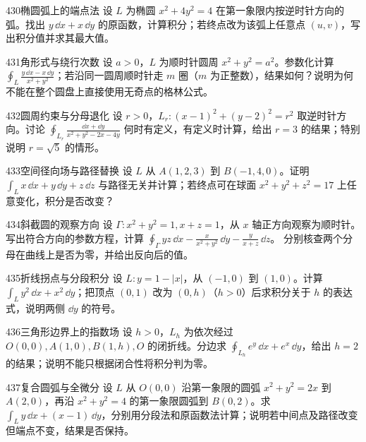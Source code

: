 \begin{exercise}{430}{椭圆弧上的端点法}
设 $L$ 为椭圆 $x^2+4y^2=4$ 在第一象限内按逆时针方向的弧。找出 $y\,\dd x+x\,\dd y$ 的原函数，计算积分；若终点改为该弧上任意点 $(u,v)$，写出积分值并求其最大值。
\end{exercise}

\begin{exercise}{431}{角形式与绕行次数}
设 $a>0$，$L$ 为顺时针圆周 $x^2+y^2=a^2$。参数化计算 $\oint_L\frac{y\,\dd x-x\,\dd y}{x^2+y^2}$；若沿同一圆周顺时针走 $m$ 圈（$m$ 为正整数），结果如何？说明为何不能在整个圆盘上直接使用无奇点的格林公式。
\end{exercise}

\begin{exercise}{432}{圆周约束与分母退化}
设 $r>0$，$L_r:(x-1)^2+(y-2)^2=r^2$ 取逆时针方向。讨论 $\oint_{L_r}\frac{\dd x+\dd y}{x^2+y^2-2x-4y}$ 何时有定义，有定义时计算，给出 $r=3$ 的结果；特别说明 $r=\sqrt5$ 的情形。
\end{exercise}

\begin{exercise}{433}{空间径向场与路径替换}
设 $L$ 从 $A(1,2,3)$ 到 $B(-1,4,0)$。证明 $\int_Lx\,\dd x+y\,\dd y+z\,\dd z$ 与路径无关并计算；若终点可在球面 $x^2+y^2+z^2=17$ 上任意变化，积分是否改变？
\end{exercise}

\begin{exercise}{434}{斜截圆的观察方向}
设 $\Gamma:x^2+y^2=1,x+z=1$，从 $x$ 轴正方向观察为顺时针。写出符合方向的参数方程，计算
$\oint_\Gamma yz\,\dd x-\frac{x}{x^2+y^2}\,\dd y-\frac{y}{x+z}\,\dd z$。
分别核查两个分母在曲线上是否为零，并给出反向后的值。
\end{exercise}

\begin{exercise}{435}{折线拐点与分段积分}
设 $L:y=1-|x|$，从 $(-1,0)$ 到 $(1,0)$。计算 $\int_Ly^2\,\dd x+x^2\,\dd y$；把顶点 $(0,1)$ 改为 $(0,h)$（$h>0$）后求积分关于 $h$ 的表达式，说明两侧 $\dd y$ 的符号。
\end{exercise}

\begin{exercise}{436}{三角形边界上的指数场}
设 $h>0$，$L_h$ 为依次经过 $O(0,0),A(1,0),B(1,h),O$ 的闭折线。分边求 $\oint_{L_h}e^y\,\dd x+e^x\,\dd y$，给出 $h=2$ 的结果；说明不能只根据闭合性将积分判为零。
\end{exercise}

\begin{exercise}{437}{复合圆弧与全微分}
设 $L$ 从 $O(0,0)$ 沿第一象限的圆弧 $x^2+y^2=2x$ 到 $A(2,0)$，再沿 $x^2+y^2=4$ 的第一象限圆弧到 $B(0,2)$。求 $\int_Ly\,\dd x+(x-1)\,\dd y$，分别用分段法和原函数法计算；说明若中间点及路径改变但端点不变，结果是否保持。
\end{exercise}


